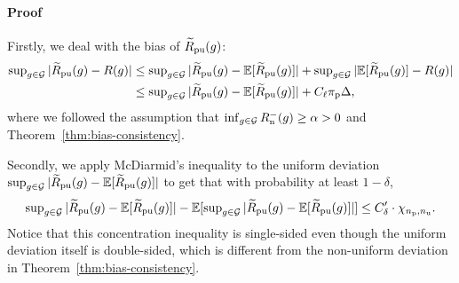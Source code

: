 \paragraph{Proof}%
Firstly, we deal with the bias of $\widetilde{R}_\mathrm{pu}(g)$:
\begin{align}
\sup\nolimits_{g\in\cG}|\tRpu(g)-R(g)|
&\le \sup\nolimits_{g\in\cG}|\tRpu(g)-\bE[\tRpu(g)]|
+\sup\nolimits_{g\in\cG}|\bE[\tRpu(g)]-R(g)| \notag\\
\label{eq:uni-dev-bias}%
&\le \sup\nolimits_{g\in\cG}|\tRpu(g)-\bE[\tRpu(g)]|
+C_\ell\pip\Delta,
\end{align}
where we followed the assumption that $\inf_{g\in\mathcal{G}}R_\mathrm{n}^-(g)\ge\alpha>0$ and Theorem~\ref{thm:bias-consistency}.

Secondly, we apply McDiarmid's inequality to the uniform deviation $\sup\nolimits_{g\in\mathcal{G}}|\widetilde{R}_\mathrm{pu}(g)-\mathbb{E}[\widetilde{R}_\mathrm{pu}(g)]|$ to get that with probability at least $1-\delta$,
\begin{align}
\label{eq:uni-dev-martingale}%
\sup\nolimits_{g\in\cG}|\tRpu(g)-\bE[\tRpu(g)]|
-\bE[\sup\nolimits_{g\in\cG}|\tRpu(g)-\bE[\tRpu(g)]|]
\le C'_\delta\cdot\chi_{\Np,\Nu}.
\end{align}
Notice that this concentration inequality is single-sided even though the uniform deviation itself is double-sided, which is different from the non-uniform deviation in Theorem~\ref{thm:bias-consistency}.

